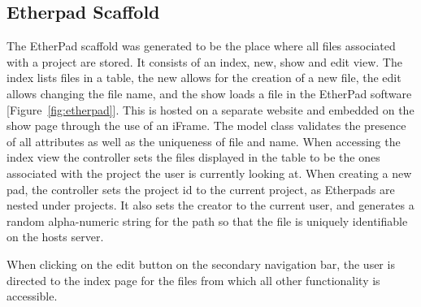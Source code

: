 \documentclass[a4wide, 11pt]{article}
\begin{document}
\subsection{Etherpad Scaffold}
The EtherPad scaffold was generated to be the place where all files associated with a project are stored. It consists of an index, new, show and edit view. The index lists files in a table, the new allows for the creation of a new file, the edit allows changing the file name, and the show loads a file in the EtherPad software [Figure~\ref{fig:etherpad}]. This is hosted on a separate website and embedded on the show page through the use of an iFrame. The model class validates the presence of all attributes as well as the uniqueness of file and name. When accessing the index view the controller sets the files displayed in the table to be the ones associated with the project the user is currently looking at. When creating a new pad, the controller sets the project id to the current project, as Etherpads are nested under projects. It also sets the creator to the current user, and generates a random alpha-numeric string for the path so that the file is uniquely identifiable on the hosts server. 

When clicking on the edit button on the secondary navigation bar, the user is directed to the index page for the files from which all other functionality is accessible. 
\end{document}
